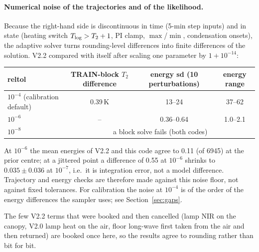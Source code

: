 \documentclass[11pt,a4paper]{article}
\begin{document}
\paragraph{Numerical noise of the trajectories and of the likelihood.} Because the right-hand side is discontinuous in
time (5-min step inputs) and in state (heating switch $T_{\rm log}>T_2+1$, PI clamp, $\max$/$\min$, condensation onsets),
the adaptive solver turns rounding-level differences into finite differences of the solution. V2.2 compared with itself
after scaling one parameter by $1+10^{-14}$:
\begin{center}\small
\begin{tabular}{lccc}\toprule
reltol & TRAIN-block $T_2$ difference & energy sd (10 perturbations) & energy range\\\midrule
$10^{-4}$ (calibration default) & 0.39\,K & 13--24 & 37--62\\
$10^{-6}$ & -- & 0.36--0.64 & 1.0--2.1\\
$10^{-8}$ & \multicolumn{3}{c}{a block solve fails (both codes)}\\\bottomrule
\end{tabular}
\end{center}
At $10^{-6}$ the mean energies of V2.2 and this code agree to 0.11 (of 6945) at the prior centre; at a jittered point a difference of 0.55 at $10^{-6}$ shrinks to $0.035\pm0.036$ at $10^{-7}$, i.e.\ it is integration error, not a model difference. Trajectory and energy checks are therefore
made against this noise floor, not against fixed tolerances. For calibration the noise at $10^{-4}$ is of the order of the
energy differences the sampler uses; see Section~\ref{sec:gaps}.

The few V2.2 terms that were booked and then cancelled (lamp NIR on the canopy, V2.0 lamp heat on the air, floor
long-wave first taken from the air and then returned) are booked once here, so the results agree to rounding rather
than bit for bit.
\end{document}
